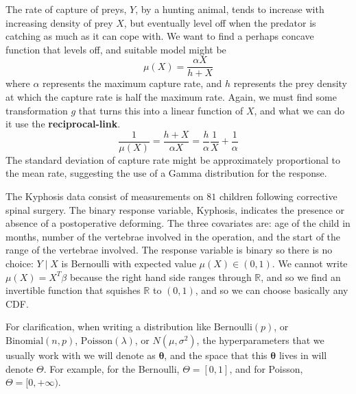   \begin{example}
    \label{ex:prey-capture-rate}
    The rate of capture of preys, $Y$, by a hunting animal, tends to increase with increasing density of prey $X$, but eventually level off when the predator is catching as much as it can cope with. We want to find a perhaps concave function that levels off, and suitable model might be 
    \begin{equation}
      \mu(X) = \frac{\alpha X}{h + X}
    \end{equation}
    where $\alpha$ represents the maximum capture rate, and $h$ represents the prey density at which the capture rate is half the maximum rate. Again, we must find some transformation $g$ that turns this into a linear function of $X$, and what we can do it use the \textbf{reciprocal-link}. 
    \begin{equation}
      \frac{1}{\mu(X)} = \frac{h + X}{\alpha X} = \frac{h}{\alpha} \frac{1}{X} + \frac{1}{\alpha}
    \end{equation}
    The standard deviation of capture rate might be approximately proportional to the mean rate, suggesting the use of a Gamma distribution for the response. 
  \end{example}

  \begin{example}
    \label{ex:kyphosis-data}
    The Kyphosis data consist of measurements on $81$ children following corrective spinal surgery. The binary response variable, Kyphosis, indicates the presence or absence of a postoperative deforming. The three covariates are: age of the child in months, number of the vertebrae involved in the operation, and the start of the range of the vertebrae involved. The response variable is binary so there is no choice: $Y \mid X$ is Bernoulli with expected value $\mu(X) \in (0, 1)$. We cannot write $\mu(X) = X^T \beta$ because the right hand side ranges through $\mathbb{R}$, and so we find an invertible function that squishes $\mathbb{R}$ to $(0, 1)$, and so we can choose basically any CDF. 
  \end{example}

  For clarification, when writing a distribution like $\mathrm{Bernoulli}(p)$, or $\mathrm{Binomial}(n, p)$, $\mathrm{Poisson}(\lambda)$, or $N(\mu, \sigma^2)$, the hyperparameters that we usually work with we will denote as $\boldsymbol{\theta}$, and the space that this $\boldsymbol{\theta}$ lives in will denote $\Theta$. For example, for the Bernoulli, $\Theta = [0, 1]$, and for Poisson, $\Theta = [0, +\infty)$. 

